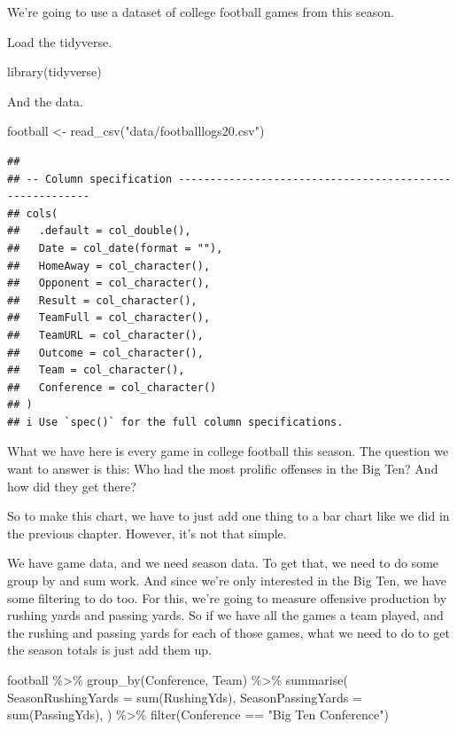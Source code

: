 \documentclass[
]{book}
\newenvironment{Shaded}{\begin{snugshade}}{\end{snugshade}}
\newcommand{\AttributeTok}[1]{\textcolor[rgb]{0.77,0.63,0.00}{#1}}
\newcommand{\FunctionTok}[1]{\textcolor[rgb]{0.00,0.00,0.00}{#1}}
\newcommand{\NormalTok}[1]{#1}
\newcommand{\OtherTok}[1]{\textcolor[rgb]{0.56,0.35,0.01}{#1}}
\newcommand{\SpecialCharTok}[1]{\textcolor[rgb]{0.00,0.00,0.00}{#1}}
\newcommand{\StringTok}[1]{\textcolor[rgb]{0.31,0.60,0.02}{#1}}
\begin{document}
We're going to use a dataset of college football games from this season.

Load the tidyverse.

\begin{Shaded}
\begin{Highlighting}[]
\FunctionTok{library}\NormalTok{(tidyverse)}
\end{Highlighting}
\end{Shaded}

And the data.

\begin{Shaded}
\begin{Highlighting}[]
\NormalTok{football }\OtherTok{\textless{}{-}} \FunctionTok{read\_csv}\NormalTok{(}\StringTok{"data/footballlogs20.csv"}\NormalTok{)}
\end{Highlighting}
\end{Shaded}

\begin{verbatim}
## 
## -- Column specification --------------------------------------------------------
## cols(
##   .default = col_double(),
##   Date = col_date(format = ""),
##   HomeAway = col_character(),
##   Opponent = col_character(),
##   Result = col_character(),
##   TeamFull = col_character(),
##   TeamURL = col_character(),
##   Outcome = col_character(),
##   Team = col_character(),
##   Conference = col_character()
## )
## i Use `spec()` for the full column specifications.
\end{verbatim}

What we have here is every game in college football this season. The question we want to answer is this: Who had the most prolific offenses in the Big Ten? And how did they get there?

So to make this chart, we have to just add one thing to a bar chart like we did in the previous chapter. However, it's not that simple.

We have game data, and we need season data. To get that, we need to do some group by and sum work. And since we're only interested in the Big Ten, we have some filtering to do too. For this, we're going to measure offensive production by rushing yards and passing yards. So if we have all the games a team played, and the rushing and passing yards for each of those games, what we need to do to get the season totals is just add them up.

\begin{Shaded}
\begin{Highlighting}[]
\NormalTok{football }\SpecialCharTok{\%\textgreater{}\%} 
  \FunctionTok{group\_by}\NormalTok{(Conference, Team) }\SpecialCharTok{\%\textgreater{}\%} 
  \FunctionTok{summarise}\NormalTok{(}
    \AttributeTok{SeasonRushingYards =} \FunctionTok{sum}\NormalTok{(RushingYds),}
    \AttributeTok{SeasonPassingYards =} \FunctionTok{sum}\NormalTok{(PassingYds),}
\NormalTok{  ) }\SpecialCharTok{\%\textgreater{}\%} \FunctionTok{filter}\NormalTok{(Conference }\SpecialCharTok{==} \StringTok{"Big Ten Conference"}\NormalTok{)}
\end{Highlighting}
\end{Shaded}
\end{document}
